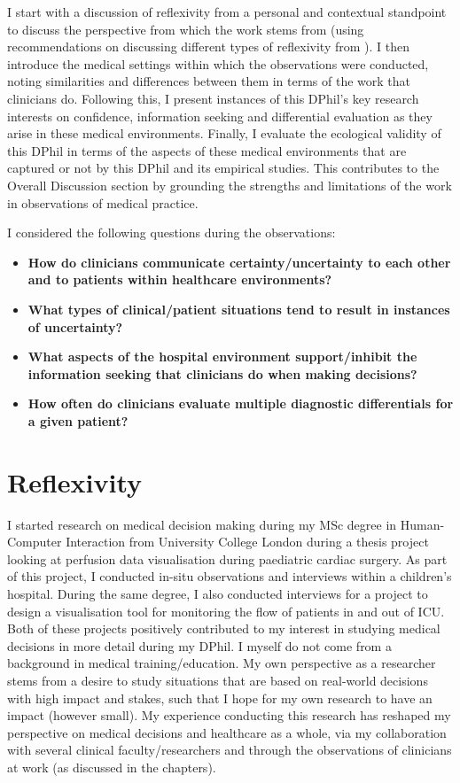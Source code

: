 \documentclass[a4paper, nobind]{templates/ociamthesis}
\providecommand{\tightlist}{%
  \setlength{\itemsep}{0pt}\setlength{\parskip}{0pt}}
\begin{document}
\hfill\break
I start with a discussion of reflexivity from a personal and contextual standpoint to discuss the perspective from which the work stems from (using recommendations on discussing different types of reflexivity from \autocite{olmos-vega_practical_2023}). I then introduce the medical settings within which the observations were conducted, noting similarities and differences between them in terms of the work that clinicians do. Following this, I present instances of this DPhil's key research interests on confidence, information seeking and differential evaluation as they arise in these medical environments. Finally, I evaluate the ecological validity of this DPhil in terms of the aspects of these medical environments that are captured or not by this DPhil and its empirical studies. This contributes to the Overall Discussion section by grounding the strengths and limitations of the work in observations of medical practice.

\hfill\break
I considered the following questions during the observations:

\begin{itemize}
\tightlist
\item
  \textbf{How do clinicians communicate certainty/uncertainty to each other and to patients within healthcare environments?}
\item
  \textbf{What types of clinical/patient situations tend to result in instances of uncertainty?}
\item
  \textbf{What aspects of the hospital environment support/inhibit the information seeking that clinicians do when making decisions?}
\item
  \textbf{How often do clinicians evaluate multiple diagnostic differentials for a given patient?}
\end{itemize}

\section*{Reflexivity}\label{reflexivity}

I started research on medical decision making during my MSc degree in Human-Computer Interaction from University College London during a thesis project looking at perfusion data visualisation during paediatric cardiac surgery. As part of this project, I conducted in-situ observations and interviews within a children's hospital. During the same degree, I also conducted interviews for a project to design a visualisation tool for monitoring the flow of patients in and out of ICU. Both of these projects positively contributed to my interest in studying medical decisions in more detail during my DPhil. I myself do not come from a background in medical training/education. My own perspective as a researcher stems from a desire to study situations that are based on real-world decisions with high impact and stakes, such that I hope for my own research to have an impact (however small). My experience conducting this research has reshaped my perspective on medical decisions and healthcare as a whole, via my collaboration with several clinical faculty/researchers and through the observations of clinicians at work (as discussed in the chapters).
\end{document}

